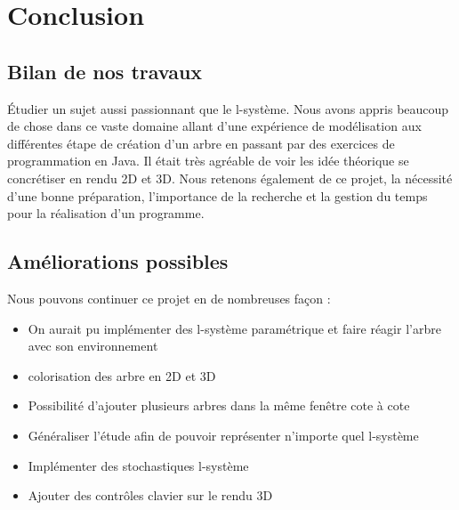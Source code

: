 \chapter{Conclusion}

\section{Bilan de nos travaux}
	Étudier un sujet aussi passionnant que le l-système. Nous avons appris beaucoup de chose dans ce vaste domaine allant d'une expérience de modélisation aux différentes étape de création d'un arbre en passant par des exercices de programmation en Java. 
	Il était très agréable de voir les idée théorique se concrétiser en rendu 2D et 3D. Nous retenons également de ce projet, la nécessité d’une bonne préparation, l’importance de la recherche et la gestion du temps pour la réalisation d’un programme.
	
\section{Améliorations possibles}

Nous pouvons continuer ce projet en de nombreuses façon :  
\begin{itemize}
	\item On aurait pu implémenter des l-système paramétrique et faire réagir l'arbre avec son environnement 
	\item colorisation des arbre en 2D et 3D
	\item Possibilité d'ajouter plusieurs arbres dans la même fenêtre cote à cote
	\item Généraliser l'étude afin de pouvoir représenter n'importe quel l-système
	\item Implémenter des stochastiques l-système
	\item Ajouter des contrôles clavier sur le rendu 3D 
\end{itemize}
